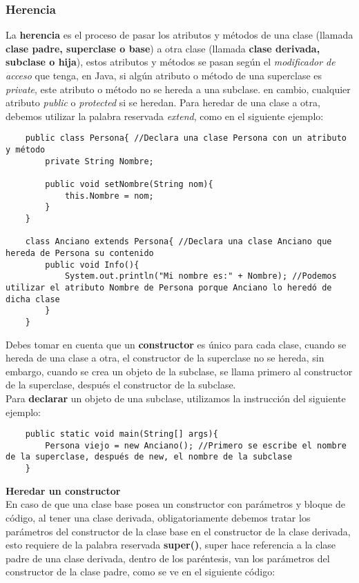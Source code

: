 \subsubsection{Herencia}
La \textbf{herencia} es el proceso de pasar los atributos y métodos de una clase (llamada \textbf{clase padre, superclase o base}) a otra clase (llamada \textbf{clase derivada, subclase o hija}), estos atributos y métodos se pasan según el \textit{modificador de acceso} que tenga, en Java, si algún atributo o método de una superclase es \textit{private}, este atributo o método no se hereda a una subclase. en cambio, cualquier atributo \textit{public} o \textit{protected} si se heredan. Para heredar de una clase a otra, debemos utilizar la palabra reservada \textit{extend}, como en el siguiente ejemplo:
\begin{lstlisting}
    public class Persona{ //Declara una clase Persona con un atributo y método
        private String Nombre;
        
        public void setNombre(String nom){
            this.Nombre = nom;
        }
    }
    
    class Anciano extends Persona{ //Declara una clase Anciano que hereda de Persona su contenido
        public void Info(){
            System.out.println("Mi nombre es:" + Nombre); //Podemos utilizar el atributo Nombre de Persona porque Anciano lo heredó de dicha clase
        }
    }
\end{lstlisting}
Debes tomar en cuenta que un \textbf{constructor} es único para cada clase, cuando se hereda de una clase a otra, el constructor de la superclase no se hereda, sin embargo, cuando se crea un objeto de la subclase, se llama primero al constructor de la superclase, después el constructor de la subclase.\\
Para \textbf{declarar} un objeto de una subclase, utilizamos la instrucción del siguiente ejemplo:
\begin{lstlisting}
    public static void main(String[] args){
        Persona viejo = new Anciano(); //Primero se escribe el nombre de la superclase, después de new, el nombre de la subclase
    }
\end{lstlisting}
\textbf{Heredar un constructor}\\
En caso de que una clase base posea un constructor con parámetros y bloque de código, al tener una clase derivada, obligatoriamente debemos tratar los parámetros del constructor de la clase base en el constructor de la clase derivada, esto requiere de la palabra reservada \textbf{super()}, super hace referencia a la clase padre de una clase derivada, dentro de los paréntesis, van los parámetros del constructor de la clase padre, como se ve en el siguiente código:
